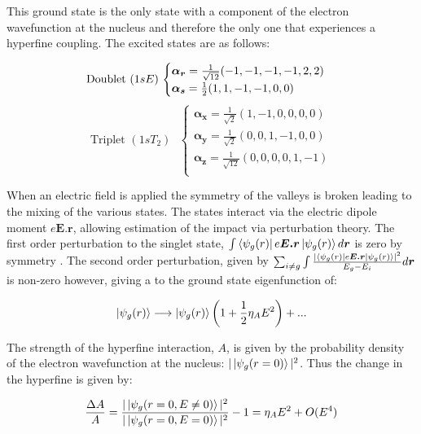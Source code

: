 This ground state is the only state with a component of the electron wavefunction at the nucleus and therefore the only one that experiences a hyperfine coupling. 
The excited states are as follows:

\begin{equation}
\text{Doublet  } (1sE) \text{  }
\begin{cases}
\bm{\alpha_r} = \frac{1}{\sqrt{12}}(-1, -1, -1, -1, 2, 2)\\
\bm{\alpha_s} = \frac{1}{2}(1, 1, -1, -1, 0, 0)\\
\end{cases}\\
\end{equation}
\begin{equation}
\text{Triplet  } (1sT_2) \text{  } 
\begin{cases}
\bm{\alpha_x} = \frac{1}{\sqrt{2}}(1, -1, 0, 0, 0, 0)\\
\bm{\alpha_y} = \frac{1}{\sqrt{2}}(0, 0, 1, -1, 0, 0)\\
\bm{\alpha_z} = \frac{1}{\sqrt{12}}(0, 0, 0, 0, 1, -1)\\
\end{cases}
\end{equation}

When an electric field is applied the symmetry of the valleys is broken leading to the mixing of the various states. 
The states interact via the electric dipole moment $e\bm{E.r}$, allowing estimation of the impact via perturbation theory.
The first order perturbation to the singlet state, $\int\bra{\psi_g(r)}e\bm{E.r}\ket{\psi_g(r)}d\bm{r}$ is zero by symmetry \cite{Pica2014}.
The second order perturbation, given by $\sum_{i\neq g}{\int\frac{|\bra{\psi_g(r)}e\bm{E.r}\ket{\psi_g(r)}|^2}{E_g - E_i}d\bm{r}}$ is non-zero however, giving a to the ground state eigenfunction of:

\begin{equation}
\ket{\psi_g(r)} \longrightarrow \ket{\psi_g(r)}\left(1 + \frac{1}{2}\eta_A E^2 \right)+...
\end{equation}

The strength of the hyperfine interaction, $A$, is given by the probability density of the electron wavefunction at the nucleus: $|\ket{\psi_g(r=0)}|^2$. 
Thus the change in the hyperfine is given by:

\begin{equation}
\frac{\Delta A}{A} = \frac{|\ket{\psi_g(r=0, E\neq 0)}|^2}{|\ket{\psi_g(r=0, E = 0)}|^2} - 1 = \eta_AE^2 + O(E^4)
\end{equation}

